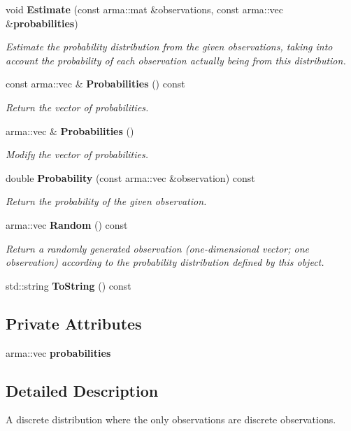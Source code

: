 \begin{DoxyCompactItemize}
void {\bf Estimate} (const arma\-::mat \&observations, const arma\-::vec \&{\bf probabilities})
\begin{DoxyCompactList}\small\item\em Estimate the probability distribution from the given observations, taking into account the probability of each observation actually being from this distribution. \end{DoxyCompactList}\item 
const arma\-::vec \& {\bf Probabilities} () const 
\begin{DoxyCompactList}\small\item\em Return the vector of probabilities. \end{DoxyCompactList}\item 
arma\-::vec \& {\bf Probabilities} ()
\begin{DoxyCompactList}\small\item\em Modify the vector of probabilities. \end{DoxyCompactList}\item 
double {\bf Probability} (const arma\-::vec \&observation) const 
\begin{DoxyCompactList}\small\item\em Return the probability of the given observation. \end{DoxyCompactList}\item 
arma\-::vec {\bf Random} () const 
\begin{DoxyCompactList}\small\item\em Return a randomly generated observation (one-\/dimensional vector; one observation) according to the probability distribution defined by this object. \end{DoxyCompactList}\item 
std\-::string {\bf To\-String} () const 
\end{DoxyCompactItemize}
\subsection*{Private Attributes}
\begin{DoxyCompactItemize}
\item 
arma\-::vec {\bf probabilities}
\end{DoxyCompactItemize}


\subsection{Detailed Description}
A discrete distribution where the only observations are discrete observations. 

